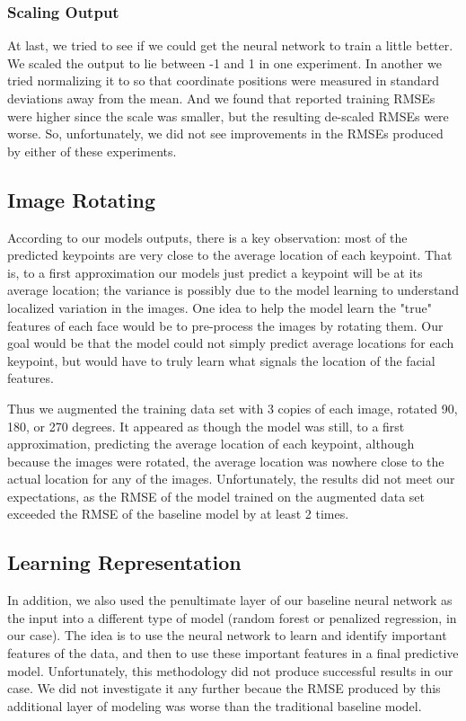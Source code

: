 \documentclass{article}
\begin{document}
\subsubsection{Scaling Output}
At last, we tried to see if we could get the neural network to train a little better. We scaled the output to lie between -1 and 1 in one experiment.  In another we tried normalizing it to so that coordinate positions were measured in standard deviations away from the mean.  And we found that reported training RMSEs were higher since the scale was smaller, but the resulting de-scaled RMSEs were worse. So, unfortunately, we did not see improvements in the RMSEs produced by either of these experiments.

\subsection{Image Rotating}

According to our models outputs, there is a key observation: most of the predicted keypoints are very close to the average location of each keypoint. That is, to a first approximation our models just predict a keypoint will be at its average location; the variance is possibly due to the model learning to understand localized variation in the images. One idea to help the model learn the "true" features of each face would be to pre-process the images by rotating them. Our goal would be that the model could not simply predict average locations for each keypoint, but would have to truly learn what signals the location of the facial features.

Thus we augmented the training data set with 3 copies of each image, rotated 90, 180, or 270 degrees. It appeared as though the model was still, to a first approximation, predicting the average location of each keypoint, although because the images were rotated, the average location was nowhere close to the actual location for any of the images. Unfortunately, the results did not meet our expectations, as the RMSE of the model trained on the augmented data set exceeded the RMSE of the baseline model by at least 2 times.

\subsection{Learning Representation}

In addition, we also used the penultimate layer of our baseline neural network as the input into a different type of model (random forest or penalized regression, in our case). The idea is to use the neural network to learn and identify important features of the data, and then to use these important features in a final predictive model. Unfortunately, this methodology did not produce successful results in our case. We did not investigate it any further becaue the RMSE produced by this additional layer of modeling was worse than the traditional baseline model.
\end{document}
